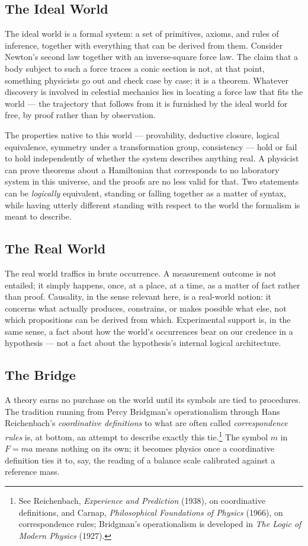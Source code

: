 \documentclass[11pt]{book}
\begin{document}
\subsection{The Ideal World}

The ideal world is a formal system: a set of primitives, axioms, and rules of inference, together with everything that can be derived from them. Consider Newton's second law together with an inverse-square force law. The claim that a body subject to such a force traces a conic section is not, at that point, something physicists go out and check case by case; it is a theorem. Whatever discovery is involved in celestial mechanics lies in locating a force law that fits the world --- the trajectory that follows from it is furnished by the ideal world for free, by proof rather than by observation.

The properties native to this world --- provability, deductive closure, logical equivalence, symmetry under a transformation group, consistency --- hold or fail to hold independently of whether the system describes anything real. A physicist can prove theorems about a Hamiltonian that corresponds to no laboratory system in this universe, and the proofs are no less valid for that. Two statements can be \emph{logically} equivalent, standing or falling together as a matter of syntax, while having utterly different standing with respect to the world the formalism is meant to describe.

\subsection{The Real World}

The real world traffics in brute occurrence. A measurement outcome is not entailed; it simply happens, once, at a place, at a time, as a matter of fact rather than proof. Causality, in the sense relevant here, is a real-world notion: it concerns what actually produces, constrains, or makes possible what else, not which propositions can be derived from which. Experimental support is, in the same sense, a fact about how the world's occurrences bear on our credence in a hypothesis --- not a fact about the hypothesis's internal logical architecture.

\subsection{The Bridge}

A theory earns no purchase on the world until its symbols are tied to procedures. The tradition running from Percy Bridgman's operationalism through Hans Reichenbach's \emph{coordinative definitions} to what are often called \emph{correspondence rules} is, at bottom, an attempt to describe exactly this tie.\footnote{See Reichenbach, \emph{Experience and Prediction} (1938), on coordinative definitions, and Carnap, \emph{Philosophical Foundations of Physics} (1966), on correspondence rules; Bridgman's operationalism is developed in \emph{The Logic of Modern Physics} (1927).} The symbol $m$ in $F = ma$ means nothing on its own; it becomes physics once a coordinative definition ties it to, say, the reading of a balance scale calibrated against a reference mass.
\end{document}

